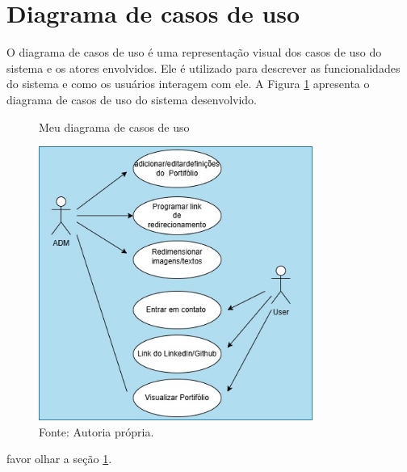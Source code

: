 \section{Diagrama de casos de uso}
\label{sec:casos}
O diagrama de casos de uso é uma representação visual dos casos de uso do sistema e os atores envolvidos. Ele é utilizado para descrever as funcionalidades do sistema e como os usuários interagem com ele. A Figura \ref{fig:casos_de_uso} apresenta o diagrama de casos de uso do sistema desenvolvido.
\begin{figure} [h!] 
    \centering
    \caption{Meu diagrama de casos de uso}
    \includegraphics[width=0.8\textwidth]{Figures/casos_de_uso.jpg}
    \caption*{Fonte: Autoria própria.}
    \label{fig:casos_de_uso}
\end{figure}

favor olhar a seção \ref{sec:casos}.

